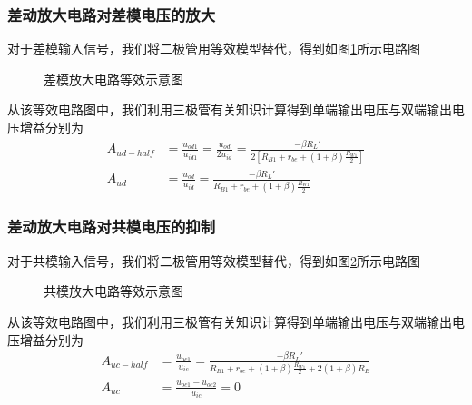 \documentclass[a4paper,11pt,UTF8]{ctexart}
\begin{document}
	\subsubsection{差动放大电路对差模电压的放大}
	对于差模输入信号，我们将二极管用等效模型替代，得到如图\ref{fig:CDequcir}所示电路图
	\begin{figure}[H]
		\centering
		\caption{差模放大电路等效示意图}
		\label{fig:CDequcir}
	\end{figure}
	从该等效电路图中，我们利用三极管有关知识计算得到单端输出电压与双端输出电压增益分别为
	\begin{equation}
		\begin{aligned}
		A_{ud-half}&=\frac{u_{od1}}{u_{id1}}=\frac{u_{od}}{2u_{id}}=\frac{-\beta R_L'}{2[R_{B1}+r_{be}+(1+\beta)\frac{R_{W1}}{2}]}\\
		A_{ud}&=\frac{u_{od}}{u_{id}}=\frac{-\beta R_L'}{R_{B1}+r_{be}+(1+\beta)\frac{R_{W1}}{2}}
		\end{aligned}
	\end{equation}
	
	\subsubsection{差动放大电路对共模电压的抑制}
	对于共模输入信号，我们将二极管用等效模型替代，得到如图\ref{fig:CCequcir}所示电路图
	\begin{figure}[H]
		\centering
		\caption{共模放大电路等效示意图}
		\label{fig:CCequcir}
	\end{figure}
	从该等效电路图中，我们利用三极管有关知识计算得到单端输出电压与双端输出电压增益分别为
	\begin{equation}
		\begin{aligned}
		A_{uc-half}&=\frac{u_{oc1}}{u_{ic}}=\frac{-\beta R_L'}{R_{B1}+r_{be}+(1+\beta)\frac{R_{W1}}{2}+2(1+\beta)R_E}\\
		A_{uc}&=\frac{u_{oc1}-u_{oc2}}{u_{ic}}=0
		\end{aligned}
	\end{equation}
\end{document}
